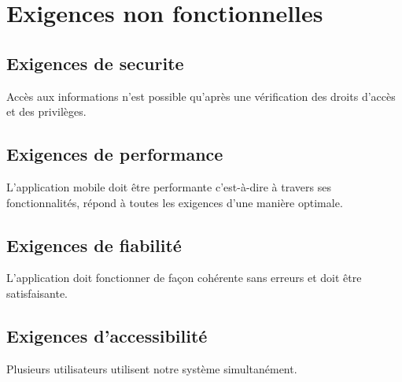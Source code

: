 \documentclass[11pt,fleqn]{book} %
\begin{document}

\section{Exigences non fonctionnelles}
\subsection{Exigences de securite}
Accès aux informations n'est possible qu'après une vérification des droits d'accès et des 
privilèges.
\subsection{Exigences de performance}
L’application mobile doit être performante c'est-à-dire à travers ses fonctionnalités, répond 
à toutes les exigences d’une manière optimale.  
\subsection{Exigences de fiabilité}
L’application doit fonctionner de façon cohérente sans erreurs et doit être satisfaisante.
    
\subsection{Exigences d’accessibilité}
Plusieurs utilisateurs utilisent notre système simultanément.


\listoffigures
\listoftables
\printindex
\end{document}
